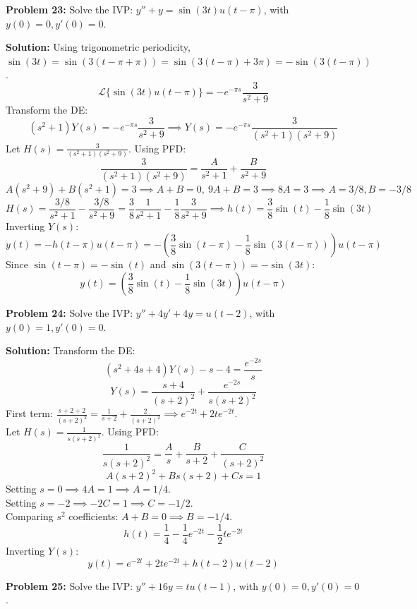 \documentclass[11pt, letterpaper]{article}
\theoremstyle{definition}
\theoremstyle{remark}
\newcommand{\Lap}{\mathcal{L}}
\begin{document}
\vspace{1em}
\textbf{Problem 23:} Solve the IVP: $y'' + y = \sin(3t) u(t-\pi)$, with $y(0) = 0, y'(0) = 0$.

\textbf{Solution:}
Using trigonometric periodicity, $\sin(3t) = \sin(3(t-\pi+\pi)) = \sin(3(t-\pi) + 3\pi) = -\sin(3(t-\pi))$.
\[ \Lap\{\sin(3t) u(t-\pi)\} = -e^{-\pi s} \frac{3}{s^2+9} \]
Transform the DE:
\[ (s^2+1)Y(s) = -e^{-\pi s} \frac{3}{s^2+9} \implies Y(s) = -e^{-\pi s} \frac{3}{(s^2+1)(s^2+9)} \]
Let $H(s) = \frac{3}{(s^2+1)(s^2+9)}$. Using PFD:
\[ \frac{3}{(s^2+1)(s^2+9)} = \frac{A}{s^2+1} + \frac{B}{s^2+9} \]
\[ A(s^2+9) + B(s^2+1) = 3 \implies A+B=0, \ 9A+B=3 \implies 8A=3 \implies A=3/8, B=-3/8 \]
\[ H(s) = \frac{3/8}{s^2+1} - \frac{3/8}{s^2+9} = \frac{3}{8}\frac{1}{s^2+1} - \frac{1}{8}\frac{3}{s^2+9} \implies h(t) = \frac{3}{8}\sin(t) - \frac{1}{8}\sin(3t) \]
Inverting $Y(s)$:
\[ y(t) = -h(t-\pi)u(t-\pi) = -\left( \frac{3}{8}\sin(t-\pi) - \frac{1}{8}\sin(3(t-\pi)) \right) u(t-\pi) \]
Since $\sin(t-\pi) = -\sin(t)$ and $\sin(3(t-\pi)) = -\sin(3t)$:
\[ y(t) = \left( \frac{3}{8}\sin(t) - \frac{1}{8}\sin(3t) \right) u(t-\pi) \]

\vspace{1em}
\textbf{Problem 24:} Solve the IVP: $y'' + 4y' + 4y = u(t-2)$, with $y(0) = 1, y'(0) = 0$.

\textbf{Solution:}
Transform the DE:
\[ (s^2+4s+4)Y(s) - s - 4 = \frac{e^{-2s}}{s} \]
\[ Y(s) = \frac{s+4}{(s+2)^2} + \frac{e^{-2s}}{s(s+2)^2} \]
First term: $\frac{s+2+2}{(s+2)^2} = \frac{1}{s+2} + \frac{2}{(s+2)^2} \implies e^{-2t} + 2te^{-2t}$. \\
Let $H(s) = \frac{1}{s(s+2)^2}$. Using PFD:
\[ \frac{1}{s(s+2)^2} = \frac{A}{s} + \frac{B}{s+2} + \frac{C}{(s+2)^2} \]
\[ A(s+2)^2 + Bs(s+2) + Cs = 1 \]
Setting $s=0 \implies 4A = 1 \implies A = 1/4$. \\
Setting $s=-2 \implies -2C = 1 \implies C = -1/2$. \\
Comparing $s^2$ coefficients: $A + B = 0 \implies B = -1/4$.
\[ h(t) = \frac{1}{4} - \frac{1}{4}e^{-2t} - \frac{1}{2}te^{-2t} \]
Inverting $Y(s)$:
\[ y(t) = e^{-2t} + 2te^{-2t} + h(t-2)u(t-2) \]

\vspace{1em}
\textbf{Problem 25:} Solve the IVP: $y'' + 16y = t u(t-1)$, with $y(0) = 0, y'(0) = 0$.
\end{document}
